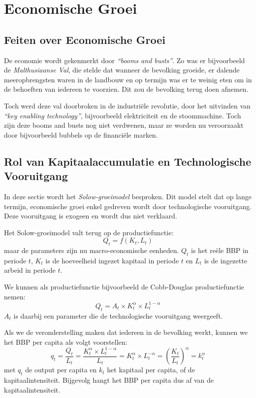 \section{Economische Groei}

\subsection{Feiten over Economische Groei}
De economie wordt gekenmerkt door \textit{``booms and busts''}. Zo was er bijvoorbeeld de \textit{Malthusiaanse Val}, die stelde dat wanneer de bevolking groeide, er dalende meeropbrengsten waren in de landbouw en op termijn was er te weinig eten om in de behoeften van iedereen te voorzien. Dit zou de bevolking terug doen afnemen.

Toch werd deze val doorbroken in de industri\"ele revolutie, door het uitvinden van \textit{``key enabling technology''}, bijvoorbeeld elektriciteit en de stoommachine. Toch zijn deze booms and busts nog niet verdwenen, maar ze worden nu veroorzaakt door bijvoorbeeld bubbels op de financi\"ele marken.

\subsection{Rol van Kapitaalaccumulatie en Technologische Vooruitgang}
In deze sectie wordt het \textit{Solow-groeimodel} besproken. Dit model stelt dat op lange termijn, economische groei enkel gedreven wordt door technologische vooruitgang. Deze vooruitgang is exogeen en wordt dus niet verklaard.

Het Solow-groeimodel valt terug op de productiefunctie:
\begin{equation}
    Q_t = f(K_t, L_t)
\end{equation}
maar de parameters zijn nu macro-economische eenheden. $Q_t$ is het re\"ele BBP in periode $t$, $K_t$ is de hoeveelheid ingezet kapitaal in periode $t$ en $L_t$ is de ingezette arbeid in periode $t$.

We kunnen als productiefunctie bijvoorbeeld de Cobb-Douglas productiefunctie nemen:
\begin{equation}
    Q_t = A_t \times K_t^\alpha \times L_t^{1-\alpha}
\end{equation}
$A_t$ is daarbij een parameter die de technologische vooruitgang weergeeft.

Als we de veronderstelling maken dat iedereen in de bevolking werkt, kunnen we het BBP per capita als volgt voorstellen:
\begin{equation}
    q_t = \frac{Q_t}{L_t} = \frac{K_t^\alpha \times L_t^{1-\alpha}}{L_t} = K_t^\alpha \times L_t^{-\alpha} = \left( \frac{K_t}{L_t} \right)^\alpha = k_t^\alpha
\end{equation}
met $q_t$ de output per capita en $k_t$ het kapitaal per capita, of de kapitaalintensiteit. Bijgevolg hangt het BBP per capita dus af van de kapitaalintensiteit.

